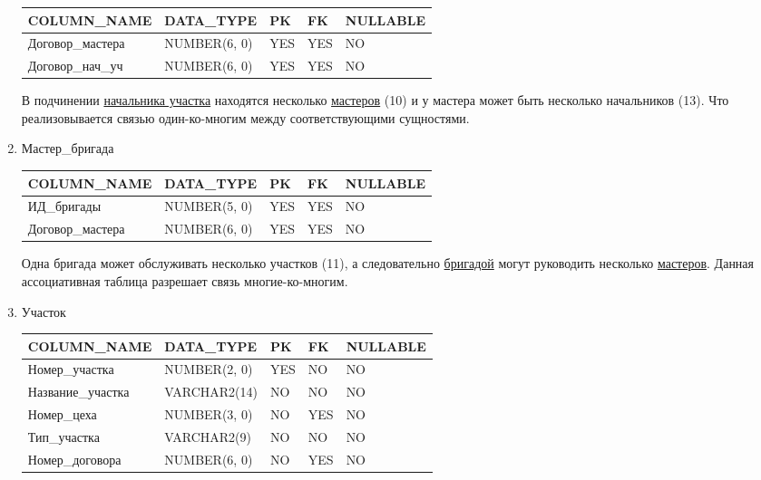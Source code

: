 \begin{enumerate}
\begin{tabular}{|p{4cm}|p{3cm}|p{1cm}|p{1cm}|p{2cm}|}
        {\bf COLUMN\_NAME} & {\bf DATA\_TYPE} & {\bf PK} & {\bf FK} & {\bf NULLABLE} \\ \hline
        Договор\_мастера & NUMBER(6, 0) & YES & YES & NO \\ \hline
        Договор\_нач\_уч & NUMBER(6, 0) & YES & YES & NO \\ \hline

    \end{tabular}

    В подчинении \underline{начальника участка} находятся несколько \underline{мастеров} (10) и у мастера может быть несколько начальников (13).
    Что реализовывается связью один-ко-многим между соответствующими сущностями.

    \item Мастер\_бригада

    \begin{tabular}{|p{4cm}|p{3cm}|p{1cm}|p{1cm}|p{2cm}|} \hline

        {\bf COLUMN\_NAME} & {\bf DATA\_TYPE} & {\bf PK} & {\bf FK} & {\bf NULLABLE} \\ \hline
        ИД\_бригады & NUMBER(5, 0) & YES & YES & NO \\ \hline
        Договор\_мастера & NUMBER(6, 0) & YES & YES & NO \\ \hline

    \end{tabular}

    Одна бригада может обслуживать несколько участков (11), а следовательно \underline{бригадой} могут руководить несколько \underline{мастеров}.
    Данная ассоциативная таблица разрешает связь многие-ко-многим.

    \item{Участок}

    \begin{tabular}{|p{4cm}|p{3cm}|p{1cm}|p{1cm}|p{2cm}|} \hline

        {\bf COLUMN\_NAME} & {\bf DATA\_TYPE} & {\bf PK} & {\bf FK} & {\bf NULLABLE} \\ \hline
        Номер\_участка & NUMBER(2, 0) & YES & NO & NO \\ \hline
        Название\_участка & VARCHAR2(14) & NO & NO & NO \\ \hline
        Номер\_цеха & NUMBER(3, 0) & NO & YES & NO \\ \hline
        Тип\_участка & VARCHAR2(9) & NO & NO & NO \\ \hline
        Номер\_договора & NUMBER(6, 0) & NO & YES & NO \\ \hline


\end{tabular}
\end{enumerate}
